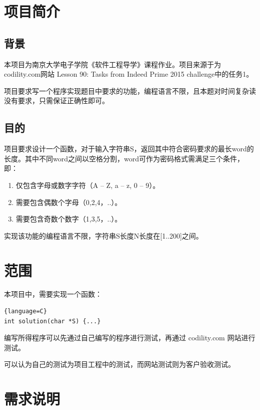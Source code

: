 




% 

\begin{spacing}{1.5}
\songti{}
    \section{项目简介}
    \subsection{背景}
    本项目为南京大学电子学院《软件工程导学》课程作业。项目来源于为codility.com网站 Lesson 90: Tasks from Indeed Prime 2015 challenge中的任务1。 

    项目要求写一个程序实现题目中要求的功能，编程语言不限，且本题对时间复杂读没有要求，只需保证正确性即可。

    \subsection{目的}
    项目要求设计一个函数，对于输入字符串S，返回其中符合密码要求的最长word的长度。其中不同word之间以空格分割，word可作为密码格式需满足三个条件，即：
    \begin{enumerate} [\indent (1)]
            \item 仅包含字母或数字字符（A -- Z, a -- z, 0 -- 9）。
            \item 需要包含偶数个字母（0,2,4，..）。
            \item 需要包含奇数个数字（1,3,5，..）。
    \end{enumerate}

    实现该功能的编程语言不限，字符串S长度N长度在[1..200]之间。
    
    \section{范围}
    本项目中，需要实现一个函数：
\begin{lstlisting}{language=C}
int solution(char *S) {...}
\end{lstlisting}

    编写所得程序可以先通过自己编写的程序进行测试，再通过 codility.com 网站进行测试。

    可以认为自己的测试为项目工程中的测试，而网站测试则为客户验收测试。

    \section{需求说明}

\end{spacing}
